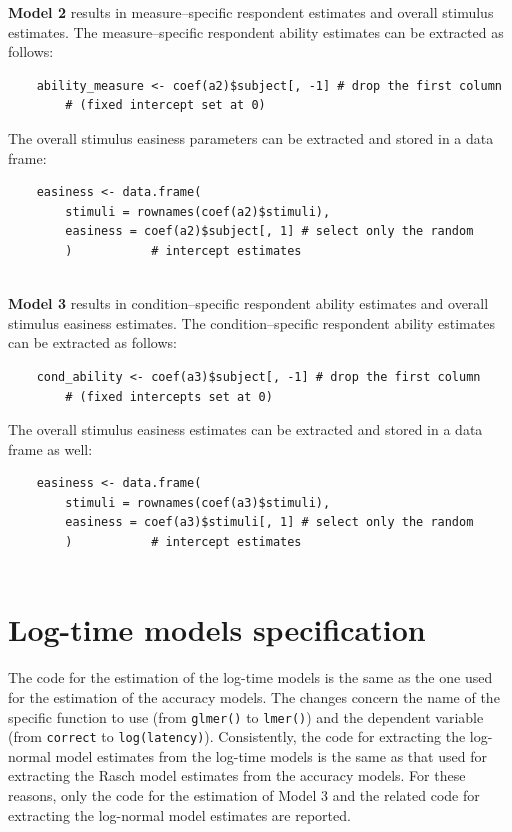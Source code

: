 \documentclass[12pt]{book}
\begin{document}
\textbf{Model 2} results in measure--specific respondent estimates and overall stimulus estimates. 
The measure--specific respondent ability estimates can be extracted as follows: 
%
\begin{lstlisting}
	ability_measure <- coef(a2)$subject[, -1] # drop the first column 
		# (fixed intercept set at 0)
\end{lstlisting}
The overall stimulus easiness parameters can be extracted and stored in a data frame: 
%
\begin{lstlisting}
	easiness <- data.frame(
		stimuli = rownames(coef(a2)$stimuli),
		easiness = coef(a2)$subject[, 1] # select only the random 
		)			# intercept estimates
	
\end{lstlisting}

\textbf{Model 3} results in condition--specific respondent ability estimates and overall stimulus easiness estimates. 
The condition--specific respondent ability estimates can be extracted as follows: 
%
\begin{lstlisting}
	cond_ability <- coef(a3)$subject[, -1] # drop the first column 
		# (fixed intercepts set at 0)
\end{lstlisting}
The overall stimulus easiness estimates can be extracted and stored in a data frame as well: 
%
\begin{lstlisting}
	easiness <- data.frame(
		stimuli = rownames(coef(a3)$stimuli),
		easiness = coef(a3)$stimuli[, 1] # select only the random
		)			# intercept estimates
	
\end{lstlisting}

\section{Log-time models specification}

The code for the estimation of the log-time models is the same as the one used for the estimation of the accuracy models. The changes concern the name of the specific function to use (from \texttt{glmer()} to \texttt{lmer()}) and the dependent variable (from \texttt{correct} to \texttt{log(latency)}). 
Consistently, the code for extracting the log-normal model estimates from the log-time models is the same as that used for extracting the Rasch model estimates from the accuracy models.
For these reasons, only the code for the estimation of Model 3 and the related code for extracting the log-normal model estimates are reported.
\end{document}
